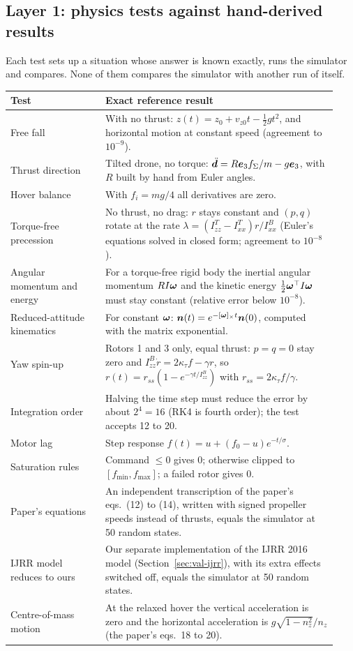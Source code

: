 \subsection{Layer 1: physics tests against hand-derived results}
Each test sets up a situation whose answer is known exactly, runs the simulator and compares. None of them compares the simulator with another run of itself.
\begin{longtable}{p{0.27\linewidth}p{0.66\linewidth}}
\toprule
Test & Exact reference result \\
\midrule
\endhead
Free fall & With no thrust: $z(t) = z_0 + v_{z0}t - \tfrac12 gt^2$, and horizontal motion at constant speed (agreement to $10^{-9}$). \\
Thrust direction & Tilted drone, no torque: $\ddot{\boldsymbol{d}} = R\boldsymbol{e}_3 f_\Sigma/m - g\boldsymbol{e}_3$, with $R$ built by hand from Euler angles. \\
Hover balance & With $f_i = mg/4$ all derivatives are zero. \\
Torque-free precession & No thrust, no drag: $r$ stays constant and $(p,q)$ rotate at the rate $\lambda = (I^T_{zz}-I^T_{xx})r/I^B_{xx}$ (Euler's equations solved in closed form; agreement to $10^{-8}$). \\
Angular momentum and energy & For a torque-free rigid body the inertial angular momentum $R I\boldsymbol{\omega}$ and the kinetic energy $\tfrac12\boldsymbol{\omega}^\top I\boldsymbol{\omega}$ must stay constant (relative error below $10^{-8}$). \\
Reduced-attitude kinematics & For constant $\boldsymbol{\omega}$: $\boldsymbol{n}(t) = e^{-[\boldsymbol{\omega}]_\times t}\boldsymbol{n}(0)$, computed with the matrix exponential. \\
Yaw spin-up & Rotors 1 and 3 only, equal thrust: $p=q=0$ stay zero and $I^B_{zz}\dot r = 2\kappa_\tau f - \gamma r$, so $r(t) = r_{ss}(1-e^{-\gamma t/I^B_{zz}})$ with $r_{ss} = 2\kappa_\tau f/\gamma$. \\
Integration order & Halving the time step must reduce the error by about $2^4 = 16$ (RK4 is fourth order); the test accepts 12 to 20. \\
Motor lag & Step response $f(t) = u + (f_0 - u)e^{-t/\sigma}$. \\
Saturation rules & Command $\le0$ gives 0; otherwise clipped to $[f_{\min}, f_{\max}]$; a failed rotor gives 0. \\
Paper's equations & An independent transcription of the paper's eqs.~(12) to (14), written with signed propeller speeds instead of thrusts, equals the simulator at 50 random states. \\
IJRR model reduces to ours & Our separate implementation of the IJRR 2016 model (Section~\ref{sec:val-ijrr}), with its extra effects switched off, equals the simulator at 50 random states. \\
Centre-of-mass motion & At the relaxed hover the vertical acceleration is zero and the horizontal acceleration is $g\sqrt{1-n_z^2}/n_z$ (the paper's eqs.~18 to 20). \\
\bottomrule
\end{longtable}

